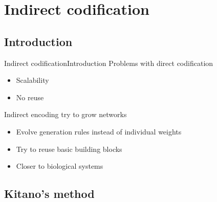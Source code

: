 \documentclass[10pt,compress]{beamer} %
\begin{document}

\section{Indirect codification}

\subsection{Introduction}
\begin{frame}{Indirect codification}{Introduction}
	Problems with direct codification
	\begin{itemize}
		\item Scalability
		\item No reuse
	\end{itemize}
	Indirect encoding try to grow networks
	\begin{itemize}
		\item Evolve generation rules instead of individual weights
		\item Try to reuse basic building blocks
		\item Closer to biological systems
	\end{itemize}
\end{frame}

\subsection{Kitano's method}
\end{document}
